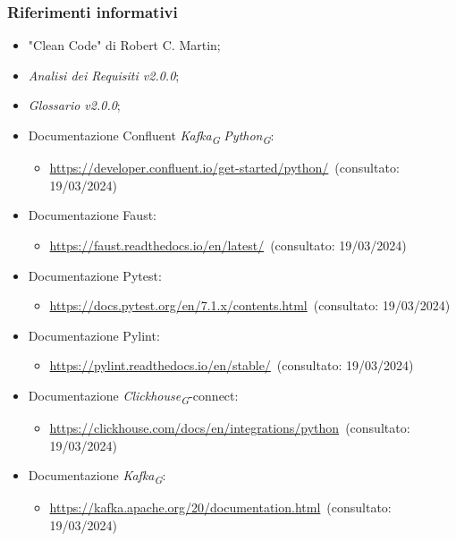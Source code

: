 \subsubsection{Riferimenti informativi}
\begin{itemize}
    \item "Clean Code" di Robert C. Martin;
    \item \textit{Analisi dei Requisiti v2.0.0};
    \item \textit{Glossario v2.0.0};
    \item Documentazione Confluent \textit{Kafka}\textsubscript{\textit{G}} \textit{Python}\textsubscript{\textit{G}}:
    \begin{itemize}
        \item \url{https://developer.confluent.io/get-started/python/}~(consultato: 19/03/2024)
    \end{itemize}
    \item Documentazione Faust: 
    \begin{itemize}
        \item \url{https://faust.readthedocs.io/en/latest/}~(consultato: 19/03/2024)
    \end{itemize}
    \item Documentazione Pytest: 
    \begin{itemize}
        \item \url{https://docs.pytest.org/en/7.1.x/contents.html}~(consultato: 19/03/2024)
    \end{itemize}
    \item Documentazione Pylint: 
    \begin{itemize}
        \item \url{https://pylint.readthedocs.io/en/stable/}~(consultato: 19/03/2024)
    \end{itemize}
    \item Documentazione \textit{Clickhouse}\textsubscript{\textit{G}}-connect: 
    \begin{itemize}
        \item \url{https://clickhouse.com/docs/en/integrations/python}~(consultato: 19/03/2024)
    \end{itemize}
    \item Documentazione \textit{Kafka}\textsubscript{\textit{G}}: 
    \begin{itemize}
        \item \url{https://kafka.apache.org/20/documentation.html}~(consultato: 19/03/2024)
    \end{itemize}

\end{itemize}
